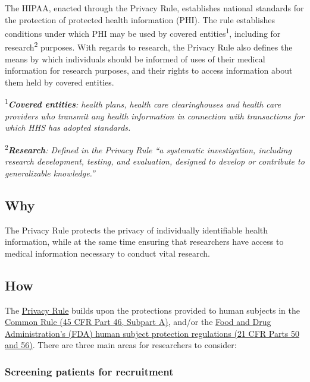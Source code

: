 \documentclass[]{book}
\begin{document}
The HIPAA, enacted through the Privacy Rule, establishes national
standards for the protection of protected health information (PHI). The
rule establishes conditions under which PHI may be used by covered
entities\textsuperscript{1}, including for research\textsuperscript{2}
purposes. With regards to research, the Privacy Rule also defines the
means by which individuals should be informed of uses of their medical
information for research purposes, and their rights to access
information about them held by covered entities.

\textsuperscript{1}\emph{\textbf{Covered entities}: health plans, health
care clearinghouses and health care providers who transmit any health
information in connection with transactions for which HHS has adopted
standards.}

\textsuperscript{2}\emph{\textbf{Research}: Defined in the Privacy Rule
``a systematic investigation, including research development, testing,
and evaluation, designed to develop or contribute to generalizable
knowledge.'' }

\subsection{Why}\label{why-6}

The Privacy Rule protects the privacy of individually identifiable
health information, while at the same time ensuring that researchers
have access to medical information necessary to conduct vital research.

\subsection{How}\label{how-6}

The \href{http://www.hhs.gov/hipaa/for-professionals/privacy/}{Privacy
Rule} builds upon the protections provided to human subjects in the
\href{http://www.hhs.gov/ohrp/regulations-and-policy/regulations/common-rule/}{Common
Rule (45 CFR Part 46, Subpart A)}, and/or the
\href{http://osp.od.nih.gov/office-clinical-research-and-bioethics-policy/clinical-research-policy/research-involving-human-subjects}{Food
and Drug Administration's (FDA) human subject protection regulations (21
CFR Parts 50 and 56)}. There are three main areas for researchers to
consider:

\subsubsection{Screening patients for
recruitment}\label{screening-patients-for-recruitment}
\end{document}
